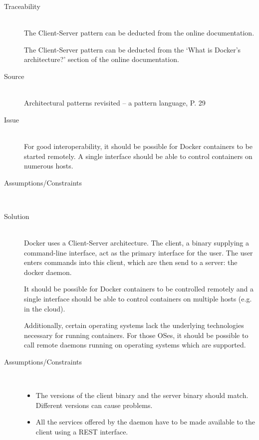 \begin{description}
\item [Traceability]~\\


The Client-Server pattern can be deducted from the online documentation\cite{dockerarchi}.

The Client-Server pattern can be deducted from the `What is Docker’s architecture?' section of the online documentation\cite{dockerarchi}.

\item [Source]~\\
Architectural patterns revisited -- a pattern language, P. 29 \cite{avgeriou2005architectural}

\item [Issue]~\\


For good interoperability, it should be possible for Docker containers to be started remotely. A single interface should be able to control containers on numerous hosts.

\item [Assumptions/Constraints]~

\item [Solution]~\\
Docker uses a Client-Server architecture. The client, a binary supplying a command-line interface, act as the primary interface for the user. The user enters commands into this client, which are then send to a server: the docker daemon. 


It should be possible for Docker containers to be controlled remotely and a single interface should be able to control containers on multiple hosts (e.g. in the cloud).

Additionally, certain operating systems lack the underlying technologies necessary for running containers. For those OSes, it should be possible to call remote daemons running on operating systems which are supported. %

\item [Assumptions/Constraints]~
\begin{itemize}
\item The versions of the client binary and the server binary should match. Different versions can cause problems.
\item All the services offered by the daemon have to be made available to the client using a REST interface.
\end{itemize}


\end{description}
